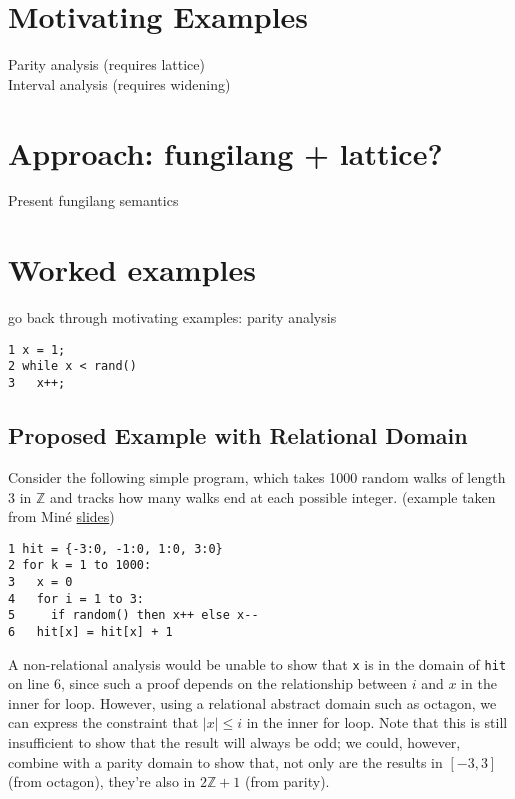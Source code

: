 \documentclass[acmlarge,anonymous]{acmart}\settopmatter{printfolios=true}
\begin{document}
\section{Motivating Examples}

Parity analysis (requires lattice)\\
Interval analysis (requires widening)

\section{Approach: fungilang + lattice?}

Present fungilang semantics

\section{Worked examples}

go back through motivating examples: parity analysis

\begin{lstlisting}
1 x = 1;
2 while x < rand()
3   x++;
\end{lstlisting}


\subsection{Proposed Example with Relational Domain}

Consider the following simple program, which takes 1000 random walks of length 3 in $\mathbb{Z}$ and tracks how many walks end at each possible integer. (example taken from Min\'e \href{https://pdfs.semanticscholar.org/ccb9/2bfe24199455d7c4a430f756c915cd4e5ae8.pdf}{slides})
\begin{lstlisting}
1 hit = {-3:0, -1:0, 1:0, 3:0}
2 for k = 1 to 1000:
3   x = 0
4   for i = 1 to 3:
5     if random() then x++ else x--
6   hit[x] = hit[x] + 1
\end{lstlisting}

A non-relational analysis would be unable to show that \texttt{x} is in the domain of \texttt{hit} on line 6, since such a proof depends on the relationship between $i$ and $x$ in the inner for loop.  However,  using a relational abstract domain such as octagon, we can express the constraint that $|x|\leq i$ in the inner for loop.  Note that this is still insufficient to show that the result will always be odd; we could, however, combine with a parity domain to show that, not only are the results in $[-3,3]$ (from octagon), they're also in $2\mathbb{Z}+1$ (from parity).
\end{document}
